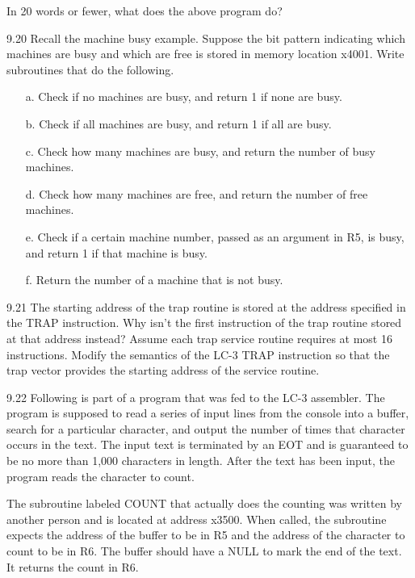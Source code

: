 \documentclass{patt}
\begin{document}
\begin{exercises}
\noindent In 20 words or fewer, what does the above program do?

\item[9.20] Recall the machine busy example. Suppose the bit pattern indicating which
machines are busy and which are free is stored in memory location x4001.
Write subroutines that do the following.
\begin{enumerate}[a.]
\item[a.] Check if no machines are busy, and return 1 if none are
  busy.
\item[b.] Check if all machines are busy, and return 1 if all are
  busy.
\item[c.] Check how many machines are busy, and return the number of
  busy machines.
\item[d.] Check how many machines are free, and return the number of
  free machines.
\item[e.] Check if a certain machine number, passed as an argument in
  R5, is busy, and return 1 if that machine is busy.
\item[f.] Return the number of a machine that is not busy.
\end{enumerate}

\item[9.21] The starting address of the trap routine is stored at the
  address specified in the TRAP instruction. Why isn't the first
  instruction of the trap routine stored at that address instead?
  Assume each trap service routine requires at most 16 instructions.
  Modify the semantics of the LC-3 TRAP instruction so that the trap
  vector provides the starting address of the service routine.

\item[9.22] Following is part of a program that was fed to the LC-3
  assembler. The program is supposed to read a series of input lines
  from the console into a buffer, search for a particular character,
  and output the number of times that character occurs in the text.
  The input text is terminated by an EOT and is guaranteed to be no
  more than 1,000 characters in length.  After the text has been
  input, the program reads the character to count.

  The subroutine labeled COUNT that actually does the counting was
  written by another person and is located at address x3500. When
  called, the subroutine expects the address of the buffer to be in R5
  and the address of the character to count to be in R6. The buffer
  should have a NULL to mark the end of the text. It returns the count
  in R6.


\end{exercises}
\end{document}
